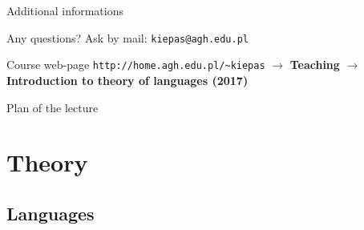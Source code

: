 \documentclass{beamer}
\begin{document}
\begin{frame}[fragile]{Additional informations}
\begin{alertblock}{Any questions?}
Ask by mail: \verb|kiepas@agh.edu.pl|
\end{alertblock}

\begin{alertblock}{Course web-page}
\verb|http://home.agh.edu.pl/~kiepas| $\rightarrow$ \textbf{Teaching} $\rightarrow$ \textbf{Introduction to theory of languages (2017)}
\end{alertblock}
\end{frame}

\begin{frame}{Plan of the lecture}
	\tableofcontents
\end{frame}

\section{Theory}

\subsection{Languages}
\end{document}
